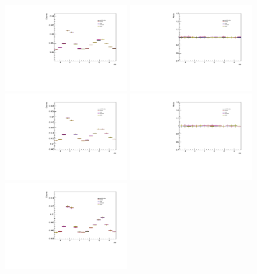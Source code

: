 \begin{figure}[ht]
    \centering
    \includegraphics[width=0.49\textwidth]{figures/analysis/signal_variations_dphi_0_20_highpt.pdf}
    \includegraphics[width=0.49\textwidth]{figures/analysis/signal_variations_dphi_0_20_highpt_ratio.pdf}
    \includegraphics[width=0.49\textwidth]{figures/analysis/signal_variations_dphi_20_50_highpt.pdf}
    \includegraphics[width=0.49\textwidth]{figures/analysis/signal_variations_dphi_20_50_highpt_ratio.pdf}
    \includegraphics[width=0.49\textwidth]{figures/analysis/signal_variations_dphi_50_80_highpt.pdf}

\end{figure}
